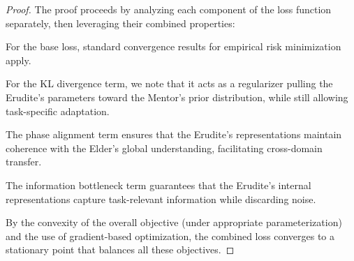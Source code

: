 \begin{proof}
The proof proceeds by analyzing each component of the loss function separately, then leveraging their combined properties:

For the base loss, standard convergence results for empirical risk minimization apply.

For the KL divergence term, we note that it acts as a regularizer pulling the Erudite's parameters toward the Mentor's prior distribution, while still allowing task-specific adaptation.

The phase alignment term ensures that the Erudite's representations maintain coherence with the Elder's global understanding, facilitating cross-domain transfer.

The information bottleneck term guarantees that the Erudite's internal representations capture task-relevant information while discarding noise.

By the convexity of the overall objective (under appropriate parameterization) and the use of gradient-based optimization, the combined loss converges to a stationary point that balances all these objectives.
\end{proof}